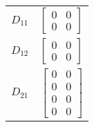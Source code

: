 \begin{tabular}{cl}
 $D_{11}$ & $\left[\begin{matrix}0 & 0\\0 & 0\end{matrix}\right]$                                                                                                                                                         \\
 $D_{12}$ & $\left[\begin{matrix}0 & 0\\0 & 0\end{matrix}\right]$                                                                                                                                                         \\
 $D_{21}$ & $\left[\begin{matrix}0 & 0\\0 & 0\\0 & 0\\0 & 0\end{matrix}\right]$                                                                                                                                           \\
\hline
\end{tabular}